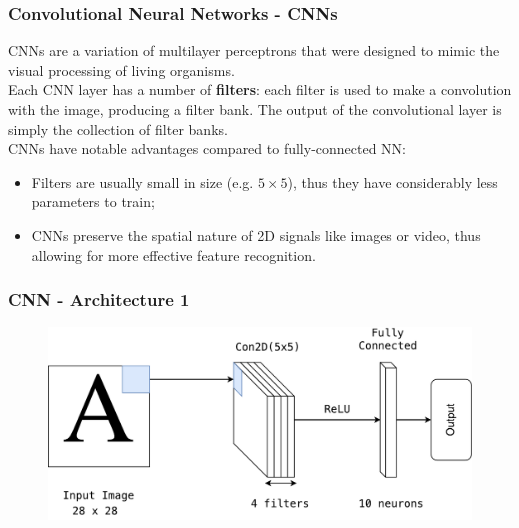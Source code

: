 \documentclass{beamer}
\begin{document}
\begin{frame}
	\frametitle{Convolutional Neural Networks - CNNs}
	CNNs are a variation of multilayer perceptrons that were designed to mimic the visual processing of living organisms. \\
	\vspace{1em}
	Each CNN layer has a number of \textbf{filters}: each filter is used to make a convolution with the image, producing a filter bank. The output of the convolutional layer is simply the collection of filter banks. \\
	\vspace{1em}
	CNNs have notable advantages compared to fully-connected NN:
	\begin{itemize}
		\item Filters are usually small in size (e.g. $5\times5$), thus they have considerably less parameters to train;
		\item CNNs preserve the spatial nature of 2D signals like images or video, thus allowing for more effective feature recognition.
	\end{itemize} 
\end{frame}


\begin{frame}
\frametitle{CNN - Architecture 1}
	\begin{figure}[hbt]
	\vspace{2em}
  	\includegraphics[width=1\textwidth,height=0.7\textheight,keepaspectratio]{diag_1}\\
    \vspace{2em}
	\end{figure}
\end{frame}
\end{document}
